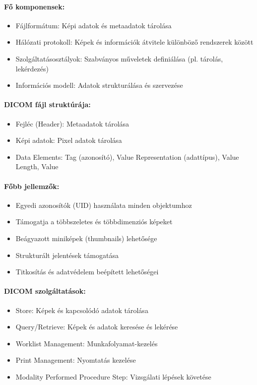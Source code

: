 \documentclass[a4paper,12pt]{article}
\begin{document}
\paragraph{Fő komponensek:} \begin{itemize} \item Fájlformátum: Képi adatok és metaadatok tárolása \item Hálózati protokoll: Képek és információk átvitele különböző rendszerek között \item Szolgáltatásosztályok: Szabványos műveletek definiálása (pl. tárolás, lekérdezés) \item Információs modell: Adatok strukturálása és szervezése \end{itemize}

\paragraph{DICOM fájl struktúrája:} \begin{itemize} \item Fejléc (Header): Metaadatok tárolása \item Képi adatok: Pixel adatok tárolása \item Data Elements: Tag (azonosító), Value Representation (adattípus), Value Length, Value \end{itemize}

\paragraph{Főbb jellemzők:} \begin{itemize} \item Egyedi azonosítók (UID) használata minden objektumhoz \item Támogatja a többszeletes és többdimenziós képeket \item Beágyazott miniképek (thumbnails) lehetősége \item Strukturált jelentések támogatása \item Titkosítás és adatvédelem beépített lehetőségei \end{itemize}

\paragraph{DICOM szolgáltatások:} \begin{itemize} \item Store: Képek és kapcsolódó adatok tárolása \item Query/Retrieve: Képek és adatok keresése és lekérése \item Worklist Management: Munkafolyamat-kezelés \item Print Management: Nyomtatás kezelése \item Modality Performed Procedure Step: Vizsgálati lépések követése \end{itemize}
\end{document}
